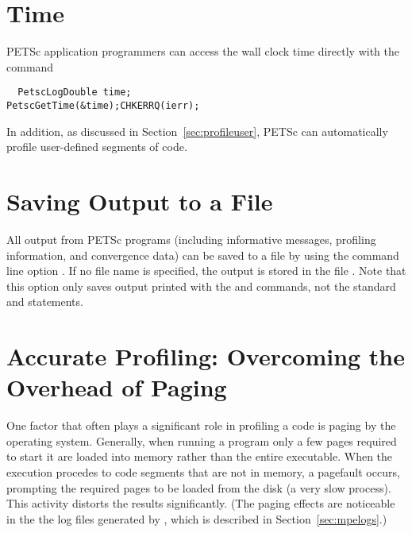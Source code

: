 \section{Time}

PETSc application programmers can access the wall clock time directly 
with the command 
\begin{verbatim}
  PetscLogDouble time;
PetscGetTime(&time);CHKERRQ(ierr);
\end{verbatim}
 
In addition, as discussed in Section~\ref{sec:profileuser},
PETSc can automatically profile user-defined segments of code.

\section{Saving Output to a File}

All output from PETSc programs (including informative messages, profiling information,
and convergence data) can be saved to a file by using the command line
option . 
If no file name is specified, the output is stored in the file .
 Note that this option only saves output printed with 
the  and  commands, not the
standard  and  statements. 
 

\section{Accurate Profiling: Overcoming the Overhead of Paging}
\label{sec:profaccuracy}

One factor that often plays a significant role in profiling a code is
paging by the operating system.  Generally, when running a program
only a few pages required to start it are loaded into memory rather
than the entire executable.  When the execution procedes to code
segments that are not in memory, a pagefault occurs, prompting the
required pages to be loaded from the disk (a very slow process).  This
activity distorts the results significantly. (The paging effects are
noticeable in the the log files generated by , which is
described in Section~\ref{sec:mpelogs}.)

